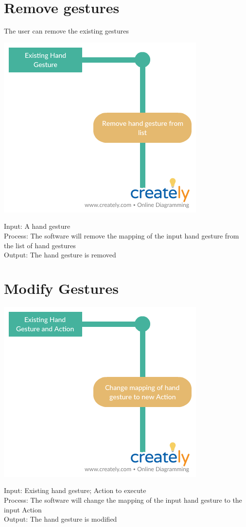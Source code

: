 \documentclass{scrreprt}
\begin{document}
\section{Remove gestures}
The user can remove the existing gestures
\begin{center}
    \includegraphics[scale=0.5]{remove.png}
\end{center}
Input: A hand gesture
\\Process: The software will remove the mapping of the input hand gesture from the list of hand gestures
\\Output: The hand gesture is removed
 
\newpage
\section{Modify Gestures}
\begin{center}
    \includegraphics[scale=0.5]{modify.png}
\end{center}
Input: Existing hand gesture; Action to execute
\\Process: The software will change the mapping of the input hand gesture to the input Action
\\Output: The hand gesture is modified
\end{document}
